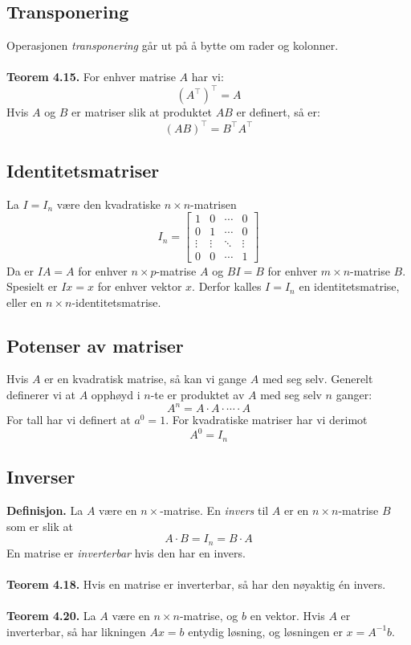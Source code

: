 \documentclass{article}
\begin{document}
\subsection{Transponering}
Operasjonen \textit{transponering} går ut på å bytte om rader og kolonner.
\\\\
\textbf{Teorem 4.15.} For enhver matrise $A$ har vi:
\[ (A^\top)^\top = A \]
Hvis $A$ og $B$ er matriser slik at produktet $AB$ er definert, så er:
\[ (AB)^\top = B^\top A^\top \]


\subsection{Identitetsmatriser}
La $I = I_n$ være den kvadratiske $n \times n$-matrisen
\[ I_n = \begin{bmatrix}
1 & 0 & \cdots & 0 \\
0 & 1 & \cdots & 0 \\
\vdots & \vdots & \ddots & \vdots \\
0 & 0 & \cdots & 1
\end{bmatrix} \]
Da er $IA = A$ for enhver $n \times p$-matrise $A$ og $BI = B$ for enhver $m \times n$-matrise $B$. Spesielt er $Ix = x$ for enhver vektor $x$. Derfor kalles $I = I_n$ en identitetsmatrise, eller en $n \times n$-identitetsmatrise.


\subsection{Potenser av matriser}
Hvis $A$ er en kvadratisk matrise, så kan vi gange $A$ med seg selv. Generelt definerer vi at $A$ opphøyd i $n$-te er produktet av $A$ med seg selv $n$ ganger:
\[ A^n = A \cdot A \cdot \cdots \cdot A \]
For tall har vi definert at $a^0 = 1$. For kvadratiske matriser har vi derimot
\[ A^0 = I_n \]


\subsection{Inverser}
\textbf{Definisjon.} La $A$ være en $n \times $-matrise. En \textit{invers} til $A$ er en $n \times n$-matrise $B$ som er slik at
\[ A \cdot B = I_n = B \cdot A \]
En matrise er \textit{inverterbar} hvis den har en invers.
\\\\
\textbf{Teorem 4.18.} Hvis en matrise er inverterbar, så har den nøyaktig én invers.
\\\\
\textbf{Teorem 4.20.} La $A$ være en $n \times n$-matrise, og $b$ en vektor. Hvis $A$ er inverterbar, så har likningen $Ax = b$ entydig løsning, og løsningen er $x = A^{-1}b$.
\end{document}
